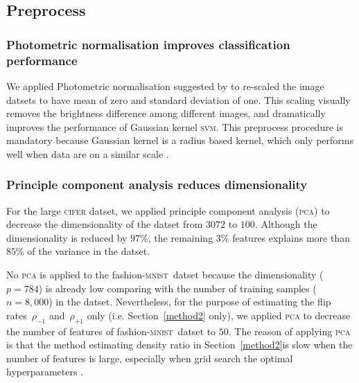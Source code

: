\documentclass[12pt]{article} %
\newcommand{\svm}{\textsc{svm}}
\newcommand{\rhoo}{\rho_{+1}}
\newcommand{\rhoz}{\rho_{-1}}
\newcommand{\mnist}{fashion-\textsc{mnist}\ }
\begin{document}
\subsection{Preprocess}\label{preproc}
\subsubsection{Photometric normalisation improves classification performance}
We applied Photometric normalisation suggested by \citet{jonsson2002support} to re-scaled the image datsets to have mean of zero and standard deviation of one. This scaling visually removes the brightness difference among different images, and dramatically improves the performance of Gaussian kernel \svm . This preprocess procedure is mandatory because Gaussian kernel is a radius based kernel, which only performs well when data are on a similar scale \citep{jonsson2002support}.

\subsubsection{Principle component analysis reduces dimensionality}
For the large \textsc{cifer} datset, we applied principle component analysis (\textsc{pca}) to decrease the dimensionality of the datset from $3072$ to $100$. Although the dimensionality is reduced by $97\%$, the remaining $3\%$ features explains more than $85\%$ of the variance in the datset.

No \textsc{pca} is applied to the \mnist datset because the dimensionality ($p=784$) is already low comparing with the number of training samples ($n=8,000$) in the datset. Nevertheless, for the purpose of estimating the flip rates~$\rhoz$ and~$\rhoo$ only (i.e. Section~\ref{method2} only), we applied \textsc{pca} to decrease the number of features of \mnist datset to $50$. The reason of applying \textsc{pca} is that the method estimating density ratio in Section~\ref{method2}is slow when the number of features is large, especially when grid search the optimal hyperparameters .
\end{document}
